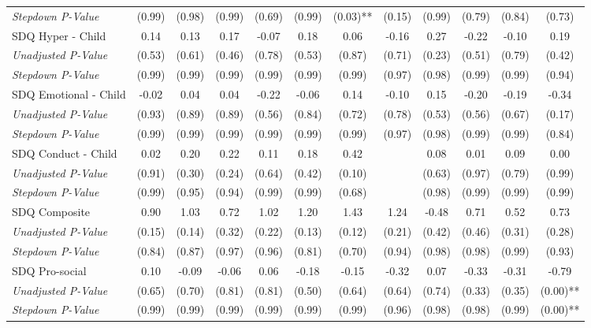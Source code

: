 \begin{tabular}{l c c c c c c c c c c c}
\quad \textit{Stepdown P-Value} & (0.99) & (0.98) & (0.99) & (0.69) & (0.99) & (0.03)** & (0.15) & (0.99) & (0.79) & (0.84) & (0.73) \\
SDQ Hyper - Child & 0.14 & 0.13 & 0.17 & -0.07 & 0.18 & 0.06 & -0.16 & 0.27 & -0.22 & -0.10 & 0.19 \\
\quad \textit{Unadjusted P-Value} & (0.53) & (0.61) & (0.46) & (0.78) & (0.53) & (0.87) & (0.71) & (0.23) & (0.51) & (0.79) & (0.42) \\
\quad \textit{Stepdown P-Value} & (0.99) & (0.99) & (0.99) & (0.99) & (0.99) & (0.99) & (0.97) & (0.98) & (0.99) & (0.99) & (0.94) \\
SDQ Emotional - Child & -0.02 & 0.04 & 0.04 & -0.22 & -0.06 & 0.14 & -0.10 & 0.15 & -0.20 & -0.19 & -0.34 \\
\quad \textit{Unadjusted P-Value} & (0.93) & (0.89) & (0.89) & (0.56) & (0.84) & (0.72) & (0.78) & (0.53) & (0.56) & (0.67) & (0.17) \\
\quad \textit{Stepdown P-Value} & (0.99) & (0.99) & (0.99) & (0.99) & (0.99) & (0.99) & (0.97) & (0.98) & (0.99) & (0.99) & (0.84) \\
SDQ Conduct - Child & 0.02 & 0.20 & 0.22 & 0.11 & 0.18 & 0.42 &  & 0.08 & 0.01 & 0.09 & 0.00 \\
\quad \textit{Unadjusted P-Value} & (0.91) & (0.30) & (0.24) & (0.64) & (0.42) & (0.10) & & (0.63) & (0.97) & (0.79) & (0.99) \\
\quad \textit{Stepdown P-Value} & (0.99) & (0.95) & (0.94) & (0.99) & (0.99) & (0.68) & & (0.98) & (0.99) & (0.99) & (0.99) \\
SDQ Composite & 0.90 & 1.03 & 0.72 & 1.02 & 1.20 & 1.43 & 1.24 & -0.48 & 0.71 & 0.52 & 0.73 \\
\quad \textit{Unadjusted P-Value} & (0.15) & (0.14) & (0.32) & (0.22) & (0.13) & (0.12) & (0.21) & (0.42) & (0.46) & (0.31) & (0.28) \\
\quad \textit{Stepdown P-Value} & (0.84) & (0.87) & (0.97) & (0.96) & (0.81) & (0.70) & (0.94) & (0.98) & (0.98) & (0.99) & (0.93) \\
SDQ Pro-social & 0.10 & -0.09 & -0.06 & 0.06 & -0.18 & -0.15 & -0.32 & 0.07 & -0.33 & -0.31 & -0.79 \\
\quad \textit{Unadjusted P-Value} & (0.65) & (0.70) & (0.81) & (0.81) & (0.50) & (0.64) & (0.64) & (0.74) & (0.33) & (0.35) & (0.00)** \\
\quad \textit{Stepdown P-Value} & (0.99) & (0.99) & (0.99) & (0.99) & (0.99) & (0.99) & (0.96) & (0.98) & (0.98) & (0.99) & (0.00)** \\

\end{tabular}
